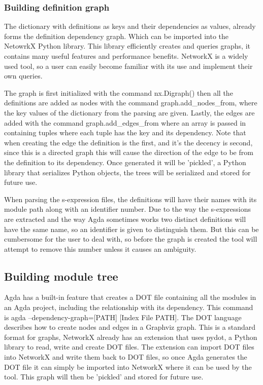 \subsubsection{Building definition graph}

The dictionary with definitions as keys and their dependencies as values,
already forms the definition dependency graph. Which can be imported into the
NetowrkX Python library. This library efficiently creates and queries graphs,
it contains many useful features and performance benefits. NetworkX is a widely
used tool, so a user can easily become familiar with its use and implement their
own queries. 

The graph is first initialized with the command \textsf{nx.Digraph()} then all
the definitions are added as nodes with the command
\textsf{graph.add\_nodes\_from}, where the key values of the dictionary from
the parsing are given. Lastly, the edges are added with the command
\textsf{graph.add\_edges\_from} where an array is passed in containing tuples
where each tuple has the key and its dependency. Note that when creating the
edge the definition is the first, and it's the decency is second, since this
is a directed graph this will cause the direction of the edge to be from the
definition to its dependency.  Once generated it will be 'pickled', a Python
library that serializes Python objects, the trees will be serialized and stored
for future use. 

When parsing the s-expression files, the definitions will have their names with
its module path along with an identifier number. Due to the way the
s-expressions are extracted and the way Agda sometimes works two distinct
definitions will have the same name, so an identifier is given to distinguish
them. But this can be cumbersome for the user to deal with, so before the graph
is created the tool will attempt to remove this number unless it causes an
ambiguity.

\subsection{Building module tree} \label{sub: Building Module Tree}

Agda has a built-in feature that creates a DOT file containing all the modules
in an Agda project, including the relationship with its dependency. This
command is \textsf{agda --dependency-graph=[PATH] [Index File PATH]}. The DOT
language describes how to create nodes and edges in a Graphviz graph. This is a
standard format for graphs, NetworkX already has an extension that uses pydot,
a Python library to read, write and create DOT files. The extension can import
DOT files into NetworkX and write them back to DOT files, so once Agda
generates the DOT file it can simply be imported into NetworkX where it can be
used by the tool. This graph will then be 'pickled' and stored for future use.

